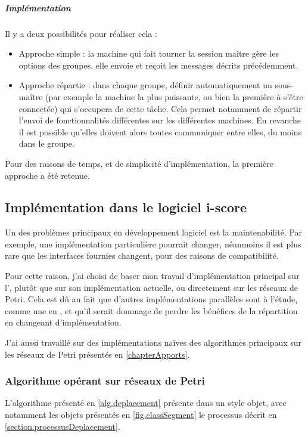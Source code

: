 \subparagraph{Implémentation}
Il y a deux possibilités pour réaliser cela : 
\begin{itemize}
	\item Approche simple : la machine qui fait tourner la session maître gère les options des groupes, elle envoie et reçoit les messages décrits précédemment.
	\item Approche répartie : dans chaque groupe, définir automatiquement un sous-maître (par exemple la machine la plus puissante, ou bien la première à s'être connectée) qui s'occupera de cette tâche. Cela permet notamment de répartir l'envoi de fonctionnalités différentes sur les différentes machines. En revanche il est possible qu'elles doivent alors toutes communiquer entre elles, du moins dans le groupe.
\end{itemize}

Pour des raisons de temps, et de simplicité d'implémentation, la première approche a été retenue.
\subsection{Implémentation dans le logiciel i-score}
Un des problèmes principaux en développement logiciel est la maintenabilité. Par exemple, une implémentation particulière pourrait changer, néanmoins il est plus rare que les interfaces fournies changent, pour des raisons de compatibilité.

Pour cette raison, j'ai choisi de baser mon travail d'implémentation principal sur l', plutôt que sur son implémentation actuelle, ou directement sur les réseaux de Petri. Cela est dû au fait que d'autres implémentations parallèles sont à l'étude, comme une en , et qu'il serait dommage de perdre les bénéfices de la répartition en changeant d'implémentation.

J'ai aussi travaillé sur des implémentations naïves des algorithmes principaux sur les réseaux de Petri présentés en \cref{chapterApports}.
\subsubsection{Algorithme opérant sur réseaux de Petri}
L'algorithme présenté en \cref{alg.deplacement} présente dans un style objet, avec notamment les objets présentés en \cref{fig.classSegment} le processus décrit en \cref{section.processusDeplacement}.

